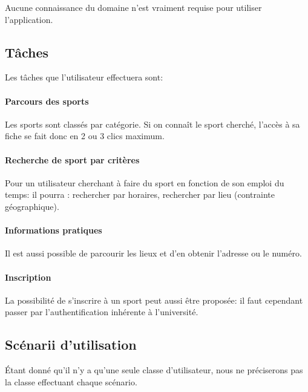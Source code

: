 \documentclass{article}
\begin{document}
		Aucune connaissance du domaine n'est vraiment requise pour utiliser
		l'application.

	\subsection{Tâches}

	 Les tâches que l'utilisateur effectuera sont:

	    \paragraph{Parcours des sports}

	        Les sports sont classés par catégorie. Si on connaît le sport
	        cherché, l'accès à sa fiche se fait donc en 2 ou 3 \og clics\fg{}
	        maximum.

        \paragraph{Recherche de sport par critères}

            Pour un utilisateur cherchant à faire du sport en fonction de son
            emploi du temps: il pourra : rechercher par horaires, rechercher par
            lieu (contrainte géographique).

        \paragraph{Informations pratiques}

            Il est aussi possible de parcourir les lieux et d'en obtenir
            l'adresse ou le numéro.

        \paragraph{Inscription}

            La possibilité de s'inscrire à un sport peut aussi être proposée: il
            faut cependant passer par l'authentification inhérente à
            l'université.


    \subsection{Scénarii d'utilisation}

    Étant donné qu'il n'y a qu'une seule classe d'utilisateur, nous ne
    préciserons pas la classe effectuant chaque scénario.
\end{document}
